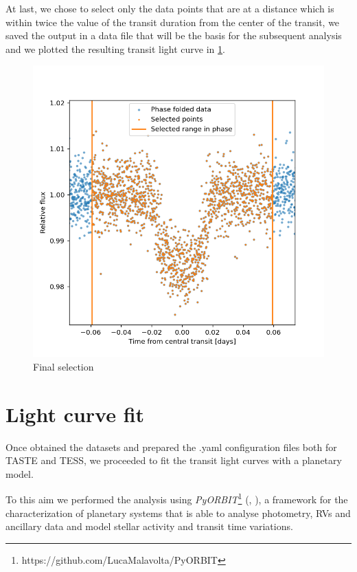 \documentclass[a4paper,11pt,twocolumn]{article}
\begin{document}
At last, we chose to select only the data points that are at a distance which is within twice the value of the transit duration from the center of the transit, 
we saved the output in a data file that will be the basis for the subsequent analysis and we plotted the resulting transit light curve in \ref{fig:final}.
\begin{figure}
  \centering
    \includegraphics[scale=0.3, angle=0]{../pictures/tess/final.png}
    \caption{Final selection}
    \label{fig:final}
\end{figure}

\newpage

\section{Light curve fit}

Once obtained the datasets and prepared the .yaml configuration files both for TASTE and TESS, we proceeded to fit the transit light curves with a planetary model.

To this aim we performed the analysis using \textit{PyORBIT}\footnote{https://github.com/LucaMalavolta/PyORBIT} (\cite{Malavolta16}, \cite{Malavolta18}), a framework for the characterization of planetary systems that is able to analyse photometry, RVs and ancillary data and model stellar activity and transit time variations.
\end{document}
